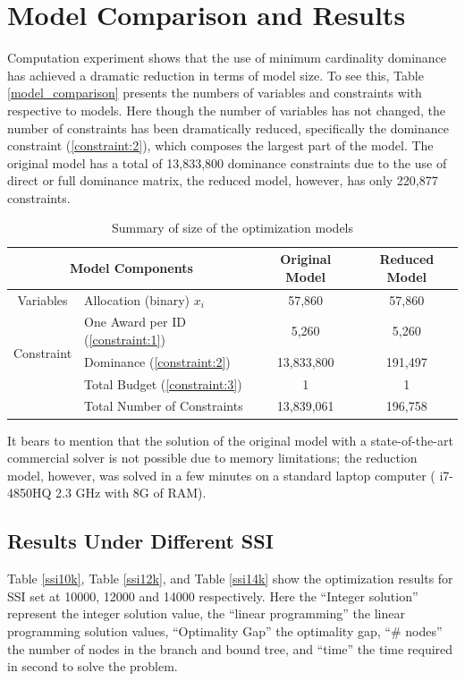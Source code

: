 \documentclass[12pt,english]{report}
\begin{document}
\section{Model Comparison and Results}
Computation experiment shows that the use of minimum cardinality dominance has achieved a dramatic reduction in terms of model size.  To see this, Table \ref{model_comparison} presents the numbers of variables and constraints with respective to models. Here though the number of variables has not changed, the number of constraints has been dramatically reduced, specifically the dominance constraint (\ref{constraint:2}), which composes the largest part of the model. The original model has a total of 13,833,800 dominance constraints due to the use of direct or full dominance matrix, the reduced model, however, has only 220,877 constraints.

\begin{table}[H]
\centering
\begin{tabular}{|c|l|c|c|}
\hline
\multicolumn{2}{|c|}{Model Components}                                        &
Original Model & Reduced Model \\ \hline
Variables                   & \multicolumn{1}{|l|}{Allocation (binary)  $x_i$}
& 57,860         & 57,860        \\ \hline
\multirow{3}{*}{Constraint} & One Award per ID  (\ref{constraint:1})        &
5,260          & 5,260         \\ \cline{2-4}
& Dominance  (\ref{constraint:2})               & 13,833,800     & 191,497
\\ \cline{2-4}
& Total Budget   (\ref{constraint:3})           & 1              & 1
\\ \cline{2-4}
& Total Number of Constraints                   & 13,839,061     & 196,758
\\ \hline
\end{tabular}
\caption{Summary of size of the optimization models }
\label{model_comparison}
\label{size_model}
\end{table}

It bears to mention that the solution of the original model with a state-of-the-art commercial solver is not possible due to memory limitations; the reduction model, however,  was solved in a few minutes on a standard laptop computer ( i7-4850HQ 2.3 GHz with 8G of RAM).

\subsection{Results Under Different SSI}
Table \ref{ssi10k}, Table \ref{ssi12k}, and Table \ref{ssi14k} show the optimization results for SSI set at 10000, 12000 and 14000 respectively.  Here the ``Integer solution'' represent the integer solution value, the ``linear programming'' the linear programming solution values, ``Optimality Gap'' the optimality gap,  ``\# nodes'' the number of nodes in the branch and bound tree,  and ``time'' the time required in second to solve the problem. 
\end{document}
